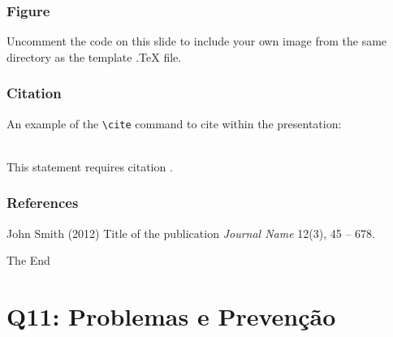 \documentclass{beamer}
\begin{document}

\begin{frame}
\frametitle{Figure}
Uncomment the code on this slide to include your own image from the same directory as the template .TeX file.
\end{frame}


\begin{frame}[fragile] %
\frametitle{Citation}
An example of the \verb|\cite| command to cite within the presentation:\\~

This statement requires citation \cite{p1}.
\end{frame}


\begin{frame}
\frametitle{References}
\footnotesize{
\begin{thebibliography}{99} %
 John Smith (2012)
\newblock Title of the publication
\newblock \emph{Journal Name} 12(3), 45 -- 678.
\end{thebibliography}
}
\end{frame}


\begin{frame}
\Huge{\centerline{The End}}
\end{frame}


\section{Q11: Problemas e Prevenção}
\end{document}
